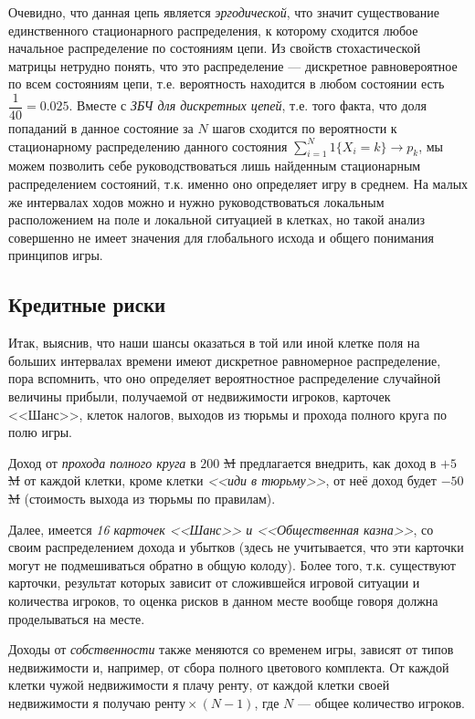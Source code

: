 	Очевидно, что данная цепь является \textit{эргодической}, что значит существование единственного стационарного распределения, к которому сходится любое начальное распределение по состояниям цепи. Из свойств стохастической матрицы нетрудно понять, что это распределение --- дискретное равновероятное по всем состояниям цепи, т.е. вероятность находится в любом состоянии есть $\dfrac{1}{40} = 0.025$. Вместе с \textit{ЗБЧ для дискретных цепей}, т.е. того факта, что доля попаданий в данное состояние за $N$ шагов сходится по вероятности к стационарному распределению данного состояния $\sum_{i = 1}^N \mathit{1}\{X_i = k\} \to p_k$, мы можем позволить себе руководствоваться лишь найденным стационарным распределением состояний, т.к. именно оно определяет игру в среднем. На малых же интервалах ходов можно и нужно руководствоваться локальным расположением на поле и локальной ситуацией в клетках, но такой анализ совершенно не имеет значения для глобального исхода и общего понимания принципов игры.
	
	\subsection*{Кредитные риски}
	
	Итак, выяснив, что наши шансы оказаться в той или иной клетке поля на больших интервалах времени имеют дискретное равномерное распределение, пора вспомнить, что оно определяет вероятностное распределение случайной величины прибыли, получаемой от недвижимости игроков, карточек <<Шанс>>, клеток налогов, выходов из тюрьмы и прохода полного круга по полю игры. 
	
	Доход от \textit{прохода полного круга} в $200$ \sout{M} предлагается внедрить, как доход в $+5$ \sout{M} от каждой клетки, кроме клетки \textit{<<иди в тюрьму>>}, от неё доход будет $-50$ \sout{M} (стоимость выхода из тюрьмы по правилам).
	
	Далее, имеется \textit{16 карточек <<Шанс>> и <<Общественная казна>>}, со своим распределением дохода и убытков (здесь не учитывается, что эти карточки могут не подмешиваться обратно в общую колоду). Более того, т.к. существуют карточки, результат которых зависит от сложившейся игровой ситуации и количества игроков, то оценка рисков в данном месте вообще говоря должна проделываться на месте. 
	
	Доходы от \textit{собственности} также меняются со временем игры, зависят от типов недвижимости и, например, от сбора полного цветового комплекта. От каждой клетки чужой недвижимости я плачу ренту, от каждой клетки своей недвижимости я получаю  $\text{ренту} \times (N - 1)$, где $N$ ---  общее количество игроков.
	
